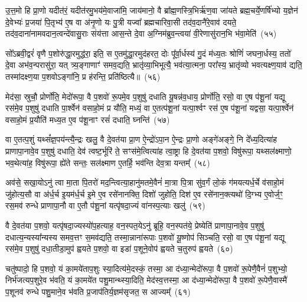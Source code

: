 उ॒त्त॒मो हि प्रा॒णो यदीत॑रं॒ यदीत॑रमु॒भय॑मे॒वाजा॑मि॒ जाय॑मानो॒ वै ब्रा᳚ह्म॒णस्त्रि॒भिर्\mbox{}ऋ॑ण॒वा जा॑यते ब्रह्म॒चर्ये॒णर्\mbox{}षि॑भ्यो य॒ज्ञेन॑ दे॒वेभ्यः॑ प्र॒जया॑ पि॒तृभ्य॑ ए॒ष वा अ॑नृ॒णो यः पु॒त्री यज्वा᳚ ब्रह्मचारिवा॒सी तद॑व॒दानै॑रे॒वाव॑ दयते॒ तद॑व॒दाना॑नामवदान॒त्वन्दे॑वासु॒राः संय॑त्ता आस॒न्ते दे॒वा अ॒ग्निम॑ब्रुव॒न्त्वया॑ वी॒रेणासु॑रान॒भि भ॑वा॒मेति॑~(५५)\ip

सो᳚\-ऽब्रवी॒द्वरं॑ वृणै प॒शोरु॑द्धा॒रमुद्ध॑रा॒ इति॒ स ए॒तमु॑द्धा॒रमुद॑हरत॒ दोः पू᳚र्वा॒र्धस्य॑ गु॒दं म॑ध्य॒तः श्रोणिं॑ जघना॒र्धस्य॒ ततो॑ दे॒वा अभ॑व॒न्परासु॑रा॒ यत् त्र्य॒ङ्गाणाꣳ॑ समव॒द्यति॒ भ्रातृ॑व्या॒भिभूत्यै॒ भव॑त्या॒त्मना॒ परा᳚स्य॒ भ्रातृ॑व्यो भवत्यक्ष्ण॒याव॑ द्यति॒ तस्मा॑दक्ष्ण॒या प॒शवो\-ऽङ्गा॑नि॒ प्र ह॑रन्ति॒ प्रति॑ष्ठित्यै॥~(५६)\ip

{\anuvakamend[{ए॒तौ प॑शू॒नाꣳ समे॑धस्यै॒व तस्यावो᳚त्त॒मस्याव॑ द्य॒तीति॒ पञ्च॑चत्वारिꣳशच्च}]}%

मेद॑सा॒ स्रुचौ॒ प्रोर्णो॑ति॒ मेदो॑रूपा॒ वै प॒शवो॑ रू॒पमे॒व प॒शुषु॑ दधाति यू॒षन्न॑व॒धाय॒ प्रोर्णो॑ति॒ रसो॒ वा ए॒ष प॑शू॒नां यद्यू रस॑मे॒व प॒शुषु॑ दधाति पा॒र्श्वेन॑ वसाहो॒मं प्र यौ॑ति॒ मध्यं॒ वा ए॒तत्प॑शू॒नां यत्पा॒र्श्वꣳ रस॑ ए॒ष प॑शू॒नां यद्वसा॒ यत्पा॒र्श्वेन॑ वसाहो॒मं प्र॒यौति॑ मध्य॒त ए॒व प॑शू॒नाꣳ रसं॑ दधाति॒ घ्नन्ति॑~(५७)\ip

वा ए॒तत्प॒शुं यथ्सं᳚ज्ञ॒पय॑न्त्यै॒न्द्रः खलु॒ वै दे॒वत॑या प्रा॒ण ऐ॒न्द्रो॑\-ऽपा॒न ऐ॒न्द्रः प्रा॒णो अङ्गे॑अङ्गे॒ नि दे᳚ध्य॒दित्या॑ह प्राणापा॒नावे॒व प॒शुषु॑ दधाति॒ देव॑ त्वष्ट॒र्भूरि॑ ते॒ सꣳस॑मे॒त्वित्या॑ह त्वा॒ष्ट्रा हि दे॒वत॑या प॒शवो॒ विषु॑रूपा॒ यथ्सल॑क्ष्माणो॒ भव॒थेत्या॑ह॒ विषु॑रूपा॒ ह्ये॑ते सन्तः॒ सल॑क्ष्माण ए॒तर्\mbox{}हि॒ भव॑न्ति देव॒त्रा यन्तम्᳚~(५८)\ip

अव॑से॒ सखा॒यो\-ऽनु॑ त्वा मा॒ता पि॒तरो॑ मद॒न्त्वित्या॒हानु॑मतमे॒वैनं॑ मा॒त्रा पि॒त्रा सु॑व॒र्गं लो॒कं ग॑मयत्यर्ध॒र्चे व॑साहो॒मं जु॑होत्य॒सौ वा अ॑र्ध॒र्च इ॒यम॑र्ध॒र्च इ॒मे ए॒व रसे॑नानक्ति॒ दिशो॑ जुहोति॒ दिश॑ ए॒व रसे॑नान॒क्त्यथो॑ दि॒ग्भ्य ए॒वोर्ज॒ꣳ॒ रस॒मव॑ रुन्धे प्राणापा॒नौ वा ए॒तौ प॑शू॒नां यत्पृ॑षदा॒ज्यं वा॑नस्प॒त्याः खलु॑~(५९)\ip

वै दे॒वत॑या प॒शवो॒ यत्पृ॑षदा॒ज्यस्यो॑प॒हत्याह॒ वन॒स्पत॒ये\-ऽनु॑ ब्रूहि॒ वन॒स्पत॑ये॒ प्रेष्येति॑ प्राणापा॒नावे॒व प॒शुषु॑ दधात्य॒न्यस्या᳚न्यस्य समव॒त्तꣳ स॒मव॑द्यति॒ तस्मा॒न्नाना॑रूपाः प॒शवो॑ यू॒ष्णोप॑ सिञ्चति॒ रसो॒ वा ए॒ष प॑शू॒नां यद्यू रस॑मे॒व प॒शुषु॑ दधा॒तीडा॒मुप॑ ह्वयते प॒शवो॒ वा इडा॑ प॒शूने॒वोप॑ ह्वयते च॒तुरुप॑ ह्वयते~(६०)\ip

चतु॑ष्पादो॒ हि प॒शवो॒ यं का॒मये॑ताप॒शुः स्या॒दित्य॑मे॒दस्कं॒ तस्मा॒ आ द॑ध्या॒न्मेदो॑रूपा॒ वै प॒शवो॑ रू॒पेणै॒वैनं॑ प॒शुभ्यो॒ निर्भ॑जत्यप॒शुरे॒व भ॑वति॒ यं का॒मये॑त पशु॒मान्थ्स्या॒दिति॒ मेद॑स्व॒त्तस्मा॒ आ द॑ध्या॒न्मेदो॑रूपा॒ वै प॒शवो॑ रू॒पेणै॒वास्मै॑ प॒शूनव॑ रुन्धे पशु॒माने॒व भ॑वति प्र॒जा\-प॑तिर्य॒ज्ञम॑सृजत॒ स आज्यम्᳚~(६१)\ip

